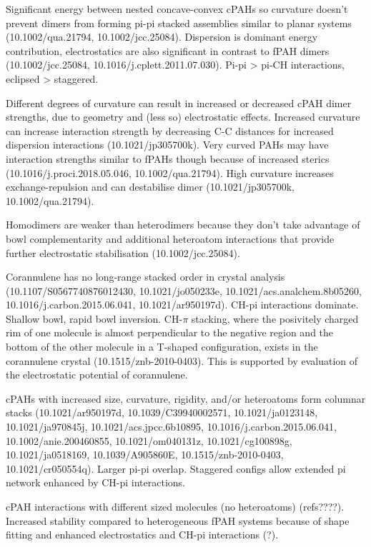 Significant energy between nested concave-convex cPAHs so curvature doesn’t prevent dimers from forming pi-pi stacked assemblies similar to planar systems (10.1002/qua.21794, 10.1002/jcc.25084).
Dispersion is dominant energy contribution, electrostatics are also significant in contrast to fPAH dimers (10.1002/jcc.25084, 10.1016/j.cplett.2011.07.030). Pi-pi > pi-CH interactions, eclipsed > staggered.

Different degrees of curvature can result in increased or decreased cPAH dimer strengths, due to geometry and (less so) electrostatic effects. Increased curvature can increase interaction strength by decreasing C-C distances for increased dispersion interactions (10.1021/jp305700k). Very curved PAHs may have interaction strengths similar to fPAHs though because of increased sterics (10.1016/j.proci.2018.05.046, 10.1002/qua.21794). High curvature increases exchange-repulsion and can destabilise dimer (10.1021/jp305700k, 10.1002/qua.21794).

Homodimers are weaker than heterodimers because they don't take advantage of bowl complementarity and additional heteroatom interactions that provide further electrostatic stabilisation (10.1002/jcc.25084).


Corannulene has no long-range stacked order in crystal analysis (10.1107/S0567740876012430, 10.1021/jo050233e, 10.1021/acs.analchem.8b05260, 10.1016/j.carbon.2015.06.041, 10.1021/ar950197d). CH-pi interactions dominate. Shallow bowl, rapid bowl inversion.
CH-$\pi$ stacking, where the posivitely charged rim of one molecule is almost perpendicular to the negative region and the bottom of the other molecule in a T-shaped configuration, exists in the corannulene crystal (10.1515/znb-2010-0403). This is supported by evaluation of the electrostatic potential of corannulene.

cPAHs with increased size, curvature, rigidity, and/or heteroatoms form columnar stacks (10.1021/ar950197d, 10.1039/C39940002571, 10.1021/ja0123148, 10.1021/ja970845j, 10.1021/acs.jpcc.6b10895, 10.1016/j.carbon.2015.06.041, 10.1002/anie.200460855, 10.1021/om040131z, 10.1021/cg100898g, 10.1021/ja0518169, 10.1039/A905860E, 10.1515/znb-2010-0403, 10.1021/cr050554q). Larger pi-pi overlap. Staggered configs allow extended pi network enhanced by CH-pi interactions.


cPAH interactions with different sized molecules (no heteroatoms) (refs????). Increased stability compared to heterogeneous fPAH systems because of shape fitting and enhanced electrostatics and CH-pi interactions (?).

